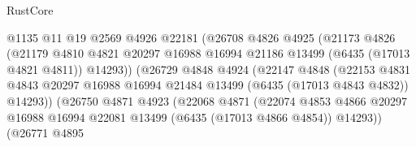 \begin{lexlean}{RustCore}
\begin{coremodule}
                                    @1135
                                    @11
                                    @19
                                    @2569
                                    @4926
                                    @22181
                                    (@26708
                                      @4826
                                      @4925
                                      (@21173
                                        @4826
                                        (@21179
                                          @4810
                                          @4821
                                          @20297
                                          @16988
                                          @16994
                                          @21186
                                          @13499
                                          (@6435 (@17013 @4821 @4811))
                                          @14293))
                                      (@26729
                                        @4848
                                        @4924
                                        (@22147
                                          @4848
                                          (@22153
                                            @4831
                                            @4843
                                            @20297
                                            @16988
                                            @16994
                                            @21484
                                            @13499
                                            (@6435 (@17013 @4843 @4832))
                                            @14293))
                                        (@26750
                                          @4871
                                          @4923
                                          (@22068
                                            @4871
                                            (@22074
                                              @4853
                                              @4866
                                              @20297
                                              @16988
                                              @16994
                                              @22081
                                              @13499
                                              (@6435 (@17013 @4866 @4854))
                                              @14293))
                                          (@26771
                                            @4895

\end{coremodule}
\end{lexlean}
